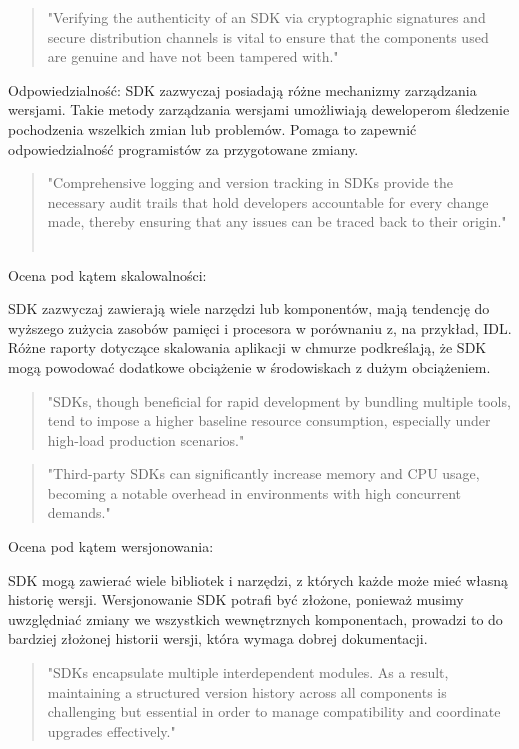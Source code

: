 \documentclass[runningheads,12pt]{llncs}
\begin{document}
\begin{quote}
    "Verifying the authenticity of an SDK via cryptographic signatures and secure distribution channels is vital to ensure that the components used are genuine and have not been tampered with." ~\cite[para 7]{azure2020}
\end{quote}

Odpowiedzialność: SDK zazwyczaj posiadają różne mechanizmy zarządzania wersjami. Takie metody zarządzania wersjami umożliwiają deweloperom śledzenie pochodzenia wszelkich zmian lub problemów. Pomaga to zapewnić odpowiedzialność programistów za przygotowane zmiany.

\begin{quote}
    "Comprehensive logging and version tracking in SDKs provide the necessary audit trails that hold developers accountable for every change made, thereby ensuring that any issues can be traced back to their origin." ~\cite[para 7]{azure2020}
\end{quote}

Ocena pod kątem skalowalności:

SDK zazwyczaj zawierają wiele narzędzi lub komponentów, mają tendencję do wyższego zużycia zasobów pamięci i procesora w porównaniu z, na przykład, IDL. Różne raporty dotyczące skalowania aplikacji w chmurze podkreślają, że SDK mogą powodować dodatkowe obciążenie w środowiskach z dużym obciążeniem.

\begin{quote}
    "SDKs, though beneficial for rapid development by bundling multiple tools, tend to impose a higher baseline resource consumption, especially under high-load production scenarios." ~\cite[para 3]{azure2020}
\end{quote}

\begin{quote}
    "Third-party SDKs can significantly increase memory and CPU usage, becoming a notable overhead in environments with high concurrent demands." ~\cite[p. 4]{ahmed2019impact}
\end{quote}

Ocena pod kątem wersjonowania:

SDK mogą zawierać wiele bibliotek i narzędzi, z których każde może mieć własną historię wersji. Wersjonowanie SDK potrafi być złożone, ponieważ musimy uwzględniać zmiany we wszystkich wewnętrznych komponentach, prowadzi to do bardziej złożonej historii wersji, która wymaga dobrej dokumentacji.

\begin{quote}
    "SDKs encapsulate multiple interdependent modules. As a result, maintaining a structured version history across all components is challenging but essential in order to manage compatibility and coordinate upgrades effectively." ~\cite[para. 3]{azure2020}
\end{quote}
\end{document}
